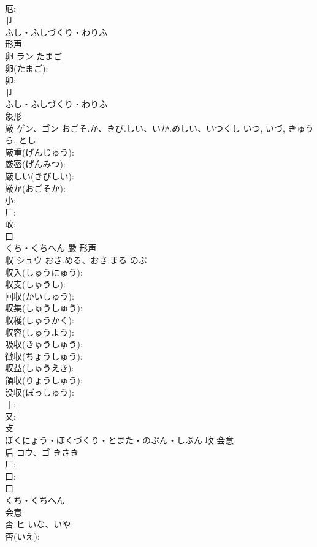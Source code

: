 \documentclass[8pt]{extreport}
\begin{document}
\begin{CJK}{UTF8}{min}
\\	厄: 
\\	卩	
\\	ふし・ふしづくり・わりふ	
\\	形声 
\\	卵	ラン	たまご		
\\	卵(たまご): 
\\	卯: 
\\	卩	
\\	ふし・ふしづくり・わりふ	
\\	象形 
\\	厳	ゲン、ゴン	おごそ.か、きび.しい、いか.めしい、いつくし	いつ, いづ, きゅうら, とし	
\\	厳重(げんじゅう): 
\\	厳密(げんみつ): 
\\	厳しい(きびしい): 
\\	厳か(おごそか): 
\\	小: 
\\	厂: 
\\	敢: 
\\	口	
\\	くち・くちへん	嚴	形声 
\\	収	シュウ	おさ.める、おさ.まる	のぶ	
\\	収入(しゅうにゅう): 
\\	収支(しゅうし): 
\\	回収(かいしゅう): 
\\	収集(しゅうしゅう): 
\\	収穫(しゅうかく): 
\\	収容(しゅうよう): 
\\	吸収(きゅうしゅう): 
\\	徴収(ちょうしゅう): 
\\	収益(しゅうえき): 
\\	領収(りょうしゅう): 
\\	没収(ぼっしゅう): 
\\	丨: 
\\	又: 
\\	攴	
\\	ぼくにょう・ぼくづくり・とまた・のぶん・しぶん	收	会意 
\\	后	コウ、ゴ	きさき		
\\	厂: 
\\	口: 
\\	口	
\\	くち・くちへん	
\\	会意 
\\	否	ヒ	いな、いや		
\\	否(いえ): 

\end{CJK}
\end{document}
